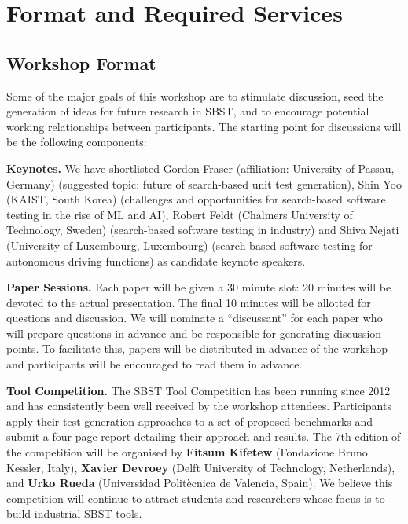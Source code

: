 \documentclass[10pt,conference]{IEEEtran}
\newcommand{\TODO}[1]{\textbf{\textcolor{ScarletRed}{[TODO: #1]}}\xspace}
\newcommand{\TODO}[1]{}
\begin{document}
\section{Format and Required Services}

\subsection{Workshop Format}

Some of the major goals of this workshop are to stimulate discussion,
seed the generation of ideas for future research in SBST, and to
encourage potential working relationships between participants.  The
starting point for discussions will be the following components:

{\bf Keynotes.}  We have shortlisted Gordon Fraser (affiliation:
University of Passau, Germany) (suggested topic: future of search-based
unit test generation), Shin Yoo (KAIST, South Korea) (challenges and
opportunities for search-based software testing in the rise of ML and
AI), Robert Feldt (Chalmers University of Technology, Sweden)
(search-based software testing in industry) and Shiva Nejati
(University of Luxembourg, Luxembourg) (search-based software testing
for autonomous driving functions) as candidate keynote
speakers. %

{\bf Paper Sessions.}  Each paper will be given a 30
minute slot: 20 minutes will be devoted to the
actual presentation.  The final 10 minutes will be allotted for
questions and discussion.  We will nominate a ``discussant'' for each
paper who will prepare questions in advance and be responsible for
generating discussion points. To facilitate this, papers will be
distributed in advance of the workshop and participants will be
encouraged to read them in advance.

{\bf Tool Competition.} The SBST Tool Competition has been running
since 2012 and has consistently been well received by the workshop
attendees. Participants apply their test generation approaches to a
set of proposed benchmarks and submit a four-page report detailing
their approach and results. The 7th edition of the competition will be
organised by {\bf Fitsum Kifetew} (Fondazione Bruno Kessler, Italy),
{\bf Xavier Devroey} (Delft University of Technology, Netherlands),
and {\bf Urko Rueda} (Universidad Politècnica de Valencia, Spain). We
believe this competition will continue to attract students and
researchers whose focus is to build industrial SBST tools.
\end{document}
